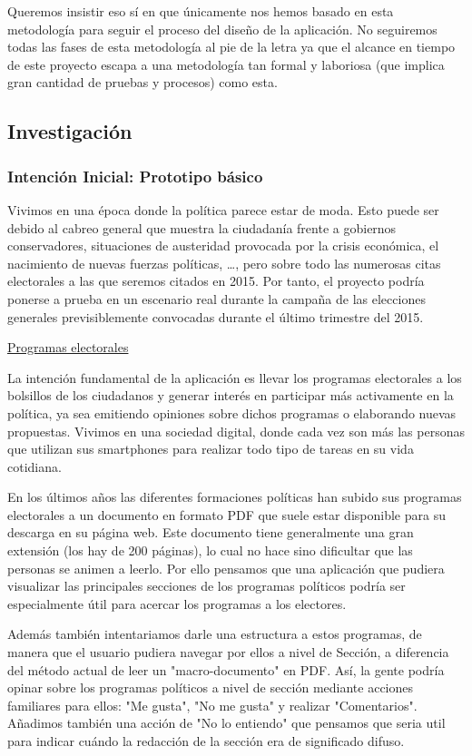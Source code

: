 Queremos insistir eso sí en que únicamente nos hemos basado en esta metodología para seguir el proceso del diseño de la aplicación. No seguiremos todas las fases de esta metodología al pie de la letra ya que el alcance en tiempo de este proyecto escapa a una metodología tan formal y laboriosa (que implica gran cantidad de pruebas y procesos) como esta.

\subsection{Investigación}

\subsubsection{Intención Inicial: Prototipo básico}  

Vivimos en una época donde la política parece estar de moda. Esto puede ser debido al cabreo general que muestra la ciudadanía frente a gobiernos conservadores, situaciones de austeridad provocada por la crisis económica, el nacimiento de nuevas fuerzas políticas, …, pero sobre todo las numerosas citas electorales a las que seremos citados en 2015. Por tanto, el proyecto podría ponerse a prueba en un escenario real durante la campaña de las elecciones generales previsiblemente convocadas durante el último trimestre del 2015.

\underline{Programas electorales}

La intención fundamental de la aplicación es llevar los programas electorales a los bolsillos de los ciudadanos y generar interés en participar más activamente en la política, ya sea emitiendo opiniones sobre dichos programas o elaborando nuevas propuestas. Vivimos en una sociedad digital, donde cada vez son más las personas que utilizan sus smartphones para realizar todo tipo de tareas en su vida cotidiana.

En los últimos años las diferentes formaciones políticas han subido sus programas electorales a un documento en formato PDF que suele estar disponible para su descarga en su página web. Este documento tiene generalmente una gran extensión (los hay de 200 páginas), lo cual no hace sino dificultar que las personas se animen a leerlo. Por ello pensamos que una aplicación que pudiera visualizar las principales secciones de los programas políticos podría ser especialmente útil para acercar los programas a los electores.

Además también intentariamos darle una estructura a estos programas, de manera que el usuario pudiera navegar por ellos a nivel de Sección, a diferencia del método actual de leer un "macro-documento" en PDF. Así, la gente podría opinar sobre los programas políticos a nivel de sección mediante acciones familiares para ellos: "Me gusta", "No me gusta" y realizar "Comentarios". Añadimos también una acción de "No lo entiendo" que pensamos que seria util para indicar cuándo la redacción de la sección era de significado difuso.

